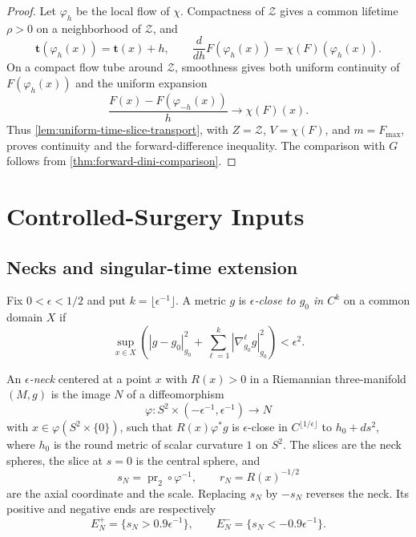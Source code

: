 \begin{proof}
Let $\varphi_h$ be the local flow of $\chi$.  Compactness of $\mathcal Z$
gives a common lifetime $\rho>0$ on a neighborhood of $\mathcal Z$, and
\[
 \mathbf t(\varphi_h(x))=\mathbf t(x)+h,
 \qquad
 \frac{d}{dh}F(\varphi_h(x))=\chi(F)(\varphi_h(x)).
\]
On a compact flow tube around $\mathcal Z$, smoothness gives both uniform
continuity of $F(\varphi_h(x))$ and the uniform expansion
\[
 \frac{F(x)-F(\varphi_{-h}(x))}{h}\longrightarrow\chi(F)(x).
\]
Thus \ref{lem:uniform-time-slice-transport}, with
$Z=\mathcal Z$, $V=\chi(F)$, and $m=F_{\max}$, proves continuity and the
forward-difference inequality.  The comparison with $G$ follows from
\ref{thm:forward-dini-comparison}.
\end{proof}

\section{Controlled-Surgery Inputs}

\subsection{Necks and singular-time extension}

\begin{definition}
\label{def:epsilon-neck-and-scale}
\notready
Fix $0<\epsilon<1/2$ and put $k=\lfloor\epsilon^{-1}\rfloor$.  A metric
$g$ is \emph{$\epsilon$-close to $g_0$ in $C^k$} on a common domain $X$ if
\[
 \sup_{x\in X}\left(
 |g-g_0|_{g_0}^2+\sum_{\ell=1}^k
 |\nabla_{g_0}^{\ell}g|_{g_0}^2\right)<\epsilon^2.
\]

An \emph{$\epsilon$-neck} centered at a point $x$ with $R(x)>0$ in a
Riemannian three-manifold
$(M,g)$ is the image $N$ of a diffeomorphism
\[
 \varphi\colon S^2\times(-\epsilon^{-1},\epsilon^{-1})\longrightarrow N
\]
with $x\in\varphi(S^2\times\{0\})$, such that
$R(x)\varphi^*g$ is $\epsilon$-close in
$C^{\lfloor1/\epsilon\rfloor}$ to $h_0+ds^2$, where $h_0$ is the round
metric of scalar curvature $1$ on $S^2$.  The slices are the neck spheres,
the slice at $s=0$ is the central sphere, and
\[
 s_N=\operatorname{pr}_2\circ\varphi^{-1},
 \qquad r_N=R(x)^{-1/2}
\]
are the axial coordinate and the scale.  Replacing $s_N$ by $-s_N$
reverses the neck.  Its positive and negative ends are respectively
\[
 E_N^+=\{s_N>0.9\epsilon^{-1}\},
 \qquad
 E_N^-=\{s_N<-0.9\epsilon^{-1}\}.
\]
\end{definition}

